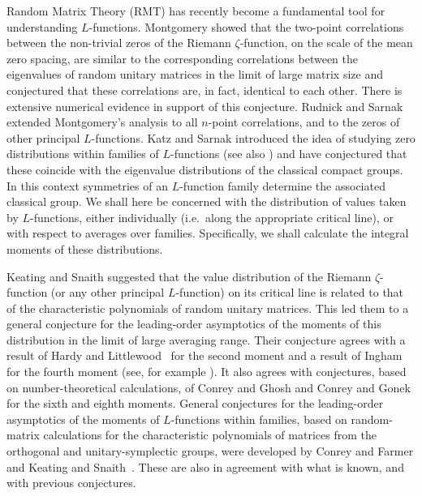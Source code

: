\documentclass[12pt,letterpaper]{amsart}
\theoremstyle{plain}
\theoremstyle{definition}
\theoremstyle{remark}
\numberwithin{equation}{subsection}
\numberwithin{theorem}{subsection}
\numberwithin{table}{subsection}
\begin{document}
Random Matrix Theory (RMT) has recently become a fundamental tool
for understanding $L$-functions. Montgomery \cite{Mon} showed that
the two-point correlations between the non-trivial zeros of the
Riemann $\zeta$-function, on the scale of the mean zero spacing,
are similar to the corresponding correlations between the
eigenvalues of random unitary matrices in the limit of large
matrix size \cite{Meh} and conjectured that these correlations
are, in fact, identical to each other.  There is extensive
numerical evidence \cite{Odl} in support of this conjecture.
Rudnick and Sarnak \cite{RS} extended Montgomery's analysis to all
$n$-point correlations, and to the zeros of other principal
$L$-functions.  Katz and Sarnak \cite{KSa} introduced the idea of
studying zero distributions within families of $L$-functions (see
also \cite{OS,Rub}) and have conjectured that these coincide with
the eigenvalue distributions of the classical compact groups. In
this context symmetries of an $L$-function family determine the
associated classical group. We shall here be concerned with the
distribution of values taken by $L$-functions, either individually
(i.e.~along the appropriate critical line), or with respect to
averages over families.  Specifically, we shall calculate the
integral moments of these distributions.

Keating and Snaith \cite{KS1} suggested that the value
distribution of the Riemann $\zeta$-function (or any other
principal $L$-function) on its critical line is related to
that of the characteristic polynomials of random unitary
matrices.  This led them to a general conjecture for the
leading-order asymptotics of the moments of this
distribution in the limit of large averaging range.   Their
conjecture agrees with a result of Hardy and Littlewood~\cite{HL} for
the second moment and a result of Ingham~\cite{I} for the fourth
moment (see, for example \cite{T}). It also agrees with
conjectures, based on number-theoretical calculations, of
Conrey and Ghosh \cite{CG2} and Conrey and Gonek \cite{CGo} for
the sixth and eighth moments.  General conjectures for the
leading-order asymptotics of the moments of $L$-functions
within families, based on random-matrix calculations for
the characteristic polynomials of matrices from the
orthogonal and unitary-symplectic groups, were developed by
Conrey and Farmer \cite{CF} and Keating and Snaith~\cite{KS2}.
These are also in agreement with what is known, and with
previous conjectures.  
\end{document}

